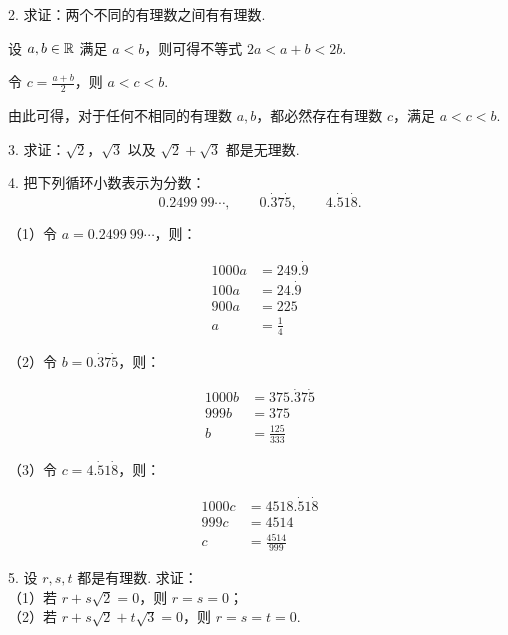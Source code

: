 \documentclass[12pt, a4paper, oneside, UTF8]{ctexbook}
\begin{document}
2. 求证：两个不同的有理数之间有有理数.

\begin{solution}
设 $a, b \in \mathbb{R}$ 满足 $a < b$，则可得不等式 $2a < a + b < 2b$.

令 $\displaystyle c = \frac{a + b}{2}$，则 $a < c < b$.

由此可得，对于任何不相同的有理数 $a, b$，都必然存在有理数 $c$，满足 $a < c < b$.
\end{solution}

3. 求证：$\sqrt{2}$，$\sqrt{3}$ 以及 $\sqrt{2} + \sqrt{3}$ 都是无理数.

\begin{solution}

\end{solution}

4. 把下列循环小数表示为分数：
\[ 0.2499\ 99\cdots,\qquad0.\dot{3}7\dot{5},\qquad4.\dot{5}1\dot{8} \text{.} \]

\begin{solution}
（1）令 $a = 0.2499\ 99\cdots$，则：

\begin{align*}
    1000a & = 249.\dot{9}\\
    100a & = 24.\dot{9}\\
    900a & = 225\\
    a & = \frac{1}{4}
\end{align*}

（2）令 $b = 0.\dot{3}7\dot{5}$，则：

\begin{align*}
    1000b & = 375.\dot{3}7\dot{5}\\
    999b & = 375\\
    b & = \frac{125}{333}
\end{align*}

（3）令 $c = 4.\dot{5}1\dot{8}$，则：

\begin{align*}
    1000c & = 4518.\dot{5}1\dot{8}\\
    999c & = 4514\\
    c & = \frac{4514}{999}
\end{align*}
\end{solution}

5. 设 $r, s, t$ 都是有理数. 求证：\\
\indent（1）若 $r + s\sqrt{2} = 0$，则 $r = s = 0$；\\
\indent（2）若 $r + s\sqrt{2} + t\sqrt{3} = 0$，则 $r = s = t = 0$.

\begin{solution}

\end{solution}
\end{document}

